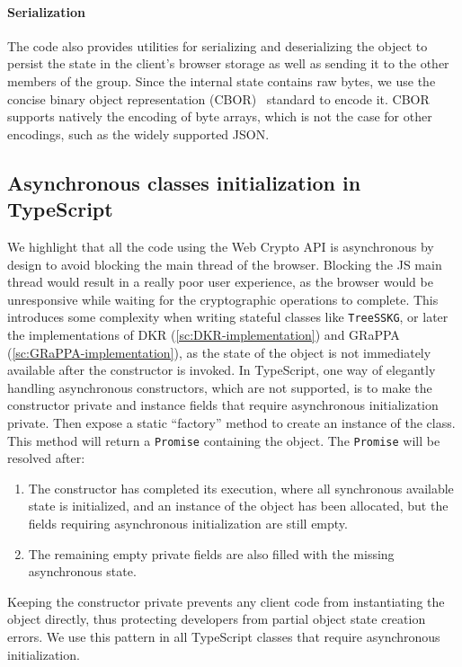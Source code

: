 \paragraph{Serialization} The code also provides utilities for serializing and deserializing 
the object to persist the state in the client's browser storage
as well as sending it to the other members of the group.
Since the internal state contains raw bytes, we use the concise binary 
object representation (CBOR)~\cite{rfc8949} standard to encode it. 
CBOR supports natively the encoding of byte arrays, which is not the case
for other encodings, such as the widely supported JSON.

\subsection{Asynchronous classes initialization in TypeScript}\label{pg:async-classes-init}
We highlight that all the code using the Web Crypto API is 
asynchronous by design to avoid blocking
the main thread of the browser. Blocking the JS main thread
would result in a really poor user experience, as the browser
would be unresponsive while waiting for the cryptographic
operations to complete. This introduces some complexity
when writing stateful classes like \texttt{TreeSSKG},
or later the implementations of DKR (\cref{sc:DKR-implementation})
and GRaPPA (\cref{sc:GRaPPA-implementation}), as the state
of the object is not immediately available after the constructor
is invoked. In TypeScript, one way of elegantly handling
asynchronous constructors, which are not supported, is to make the constructor private
and instance fields that require asynchronous initialization
private. Then expose a static ``factory'' method to create an instance of the class.
This method will return a \texttt{Promise} containing the object.
The \texttt{Promise} will be resolved after:
\begin{enumerate}
    \item The constructor has 
    completed its execution, where all synchronous available state
    is initialized, and an instance of the object has been allocated,
    but the fields requiring asynchronous initialization are still
    empty.
    \item The remaining empty private fields are also filled with the missing asynchronous state.
\end{enumerate}
Keeping the constructor private prevents any client code from instantiating the object directly, thus protecting developers from partial object state creation errors.
We use this pattern in all TypeScript classes that require asynchronous initialization.

